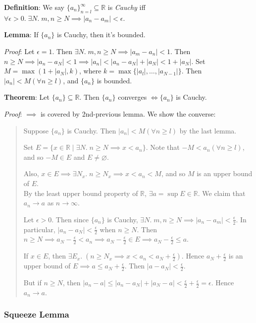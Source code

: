 \documentclass[11pt]{article}
\begin{document}
\textbf{Definition}: We say $\{a_n\}_{n=l}^\infty \subseteq \mathbb{R}$ is \emph{Cauchy} iff $\forall \epsilon > 0.\; \exists N.\; m,n \geq N \implies |a_n - a_m| < \epsilon$.

\textbf{Lemma}: If $\{a_n\}$ is Cauchy, then it's bounded.

\emph{Proof}: Let $\epsilon = 1$. Then $\exists N.\; m,n \geq N \implies |a_m - a_n| < 1$. Then $n \geq N \implies |a_n - a_N| < 1 \implies |a_n| < |a_n - a_N| + |a_N| < 1 + |a_N|$. Set $M = \max(1+ |a_N|, k)$, where $k = \max\{|a_l|, \ldots, |a_{N-1}|\}$. Then $|a_n| < M (\forall n \geq l)$, and $\{a_n\}$ is bounded.

\textbf{Theorem}: Let $\{a_n\} \subseteq \mathbb{R}$. Then $\{a_n\}$ converges $\iff \{a_n\}$ is Cauchy.

\emph{Proof}: $\implies$ is covered by 2nd-previous lemma. We show the converse:
\begin{quote}\vspace{-0.3cm}
Suppose $\{a_n\}$ is Cauchy. Then $|a_n| < M (\forall n \geq l)$ by the last lemma.

Set $E = \{x \in \mathbb{R} \mid \exists N.\; n \geq N \implies x < a_n\}$. Note that $-M < a_n (\forall n \geq l)$, and so $-M \in E$ and $E \neq \varnothing$.

Also, $x \in E \implies \exists N_x.\; n \geq N_x \implies x < a_n < M$, and so $M$ is an upper bound of $E$.\\
By the least upper bound property of $\mathbb{R}$, $\exists a = \sup E \in \mathbb{R}$. We claim that $a_n \to a$ as $n \to \infty$.

Let $\epsilon > 0$. Then since $\{a_n\}$ is Cauchy, $\exists N.\; m,n \geq N \implies |a_n - a_m| < \frac{\epsilon}{2}$. In particular, $|a_n - a_N| < \frac{\epsilon}{2}$ when $n \geq N$. Then $n \geq N \implies a_N - \frac{\epsilon}{2} < a_n \implies a_N - \frac{\epsilon}{2} \in E \implies a_N - \frac{\epsilon}{2} \leq a$.

If $x \in E$, then $\exists E_x.\; (n \geq N_x \implies x < a_n < a_N + \frac{\epsilon}{2})$. Hence $a_N + \frac{\epsilon}{2}$ is an upper bound of $E \implies a \leq a_N + \frac{\epsilon}{2}$. Then $|a - a_N| < \frac{\epsilon}{2}$.

But if $n \geq N$, then $|a_n - a| \leq |a_n - a_N| + |a_N - a| < \frac{\epsilon}{2} + \frac{\epsilon}{2} = \epsilon$. Hence $a_n \to a$.
\end{quote}

\subsubsection{Squeeze Lemma}
\end{document}
